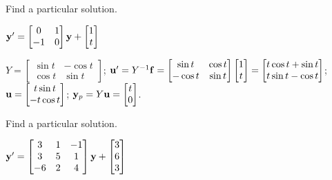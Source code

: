 \documentclass{ximera}
\begin{document}
 \begin{problem}\label{exer:10.7.6}
 Find a particular solution.
 
 $ {\bf y}'=\begin{bmatrix}0&1\\-1&0\end{bmatrix}{\bf
y}+\begin{bmatrix}1\\t\end{bmatrix}$

\begin{solution}
    $Y=\begin{bmatrix}\sin t&-\cos t\\
\cos t&\sin t\end{bmatrix}$;
${\bf u}'=Y^{-1}{\bf f}=
\begin{bmatrix}\sin t&\cos t\\-\cos t&\sin t\end{bmatrix}
\begin{bmatrix}1\\t\end{bmatrix}=
\begin{bmatrix}t\cos t+\sin t\\t\sin t-\cos
t\end{bmatrix}$;
${\bf u}=
\begin{bmatrix}t\sin t\\-t\cos t\end{bmatrix}$;
${\bf y}_p=Y{\bf u}=
\begin{bmatrix}t\\0\end{bmatrix}$.
\end{solution}
 \end{problem}


 \begin{problem}\label{exer:10.7.7}
 Find a particular solution.
 
 $ {\bf y}'=\begin{bmatrix}3&1&-1\\3&5&1\\-6&2&4\end{bmatrix}{\bf
y}+\begin{bmatrix}3\\6\\3\end{bmatrix}$
\end{problem}
\end{document}
